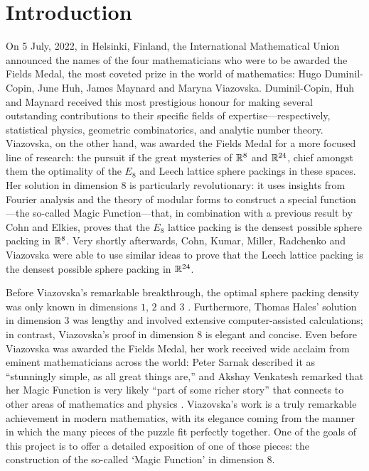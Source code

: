 \chapter{Introduction}
\label{Ch1:Chapter}
\thispagestyle{empty}

On 5 July, 2022, in Helsinki, Finland, the International Mathematical Union announced the names of the four mathematicians who were to be awarded the Fields Medal, the most coveted prize in the world of mathematics: Hugo Duminil-Copin, June Huh, James Maynard and Maryna Viazovska. Duminil-Copin, Huh and Maynard received this most prestigious honour for making several outstanding contributions to their specific fields of expertise---respectively, statistical physics, geometric combinatorics, and analytic number theory. Viazovska, on the other hand, was awarded the Fields Medal for a more focused line of research: the pursuit if the great mysteries of $\mathbb{R}^8$ and $\mathbb{R}^{24}$, chief amongst them the optimality of the $E_8$ and Leech lattice sphere packings in these spaces. Her solution in dimension $8$ is particularly revolutionary: it uses insights from Fourier analysis and the theory of modular forms to construct a special function---the so-called Magic Function---that, in combination with a previous result by Cohn and Elkies, proves that the $E_8$ lattice packing is the densest possible sphere packing in $\mathbb{R}^8$. Very shortly afterwards, Cohn, Kumar, Miller, Radchenko and Viazovska were able to use similar ideas to prove that the Leech lattice packing is the densest possible sphere packing in $\mathbb{R}^{24}$.

Before Viazovska's remarkable breakthrough, the optimal sphere packing density was only known in dimensions $1$, $2$ and $3$ \cite{CohnOnViazovskaICM}. Furthermore, Thomas Hales' solution in dimension $3$ \cite{HalesKeplerInformal} was lengthy and involved extensive computer-assisted calculations; in contrast, Viazovska's proof in dimension $8$ is elegant and concise. Even before Viazovska was awarded the Fields Medal, her work received wide acclaim from eminent mathematicians across the world: Peter Sarnak described it as ``stunningly simple, as all great things are,'' and Akshay Venkatesh remarked that her Magic Function is very likely ``part of some richer story'' that connects to other areas of mathematics and physics \cite{QuantaPiece}. Viazovska's work is a truly remarkable achievement in modern mathematics, with its elegance coming from the manner in which the many pieces of the puzzle fit perfectly together. One of the goals of this project is to offer a detailed exposition of one of those pieces: the construction of the so-called `Magic Function' in dimension $8$.



